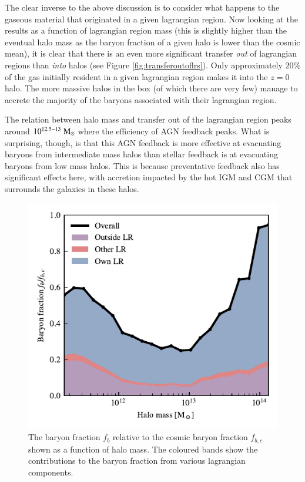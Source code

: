 The clear inverse to the above discussion is to consider what happens to the gaseous
material that originated in a given lagrangian region. Now looking at the results as
a function of lagrangian region mass (this is slightly higher than the eventual
halo mass as the baryon fraction of a given halo is lower than the cosmic mean), it
is clear that there is an even more significant transfer \emph{out} of lagrangian
regions than \emph{into} halos (see Figure \ref{fig:transferoutoflrs}). Only 
approximately $20\%$ of the gas initially resident in a given lagrangian region
makes it into the $z=0$ halo. The more massive halos in the box (of which there 
are very few) manage to accrete the majority of the baryons associated with their
lagrangian region.

The relation between halo mass and transfer out of the lagrangian region peaks
around $10^{12.5-13}\;{\rm M}_{\odot}{}$ where the efficiency of AGN feedback peaks. What
is surprising, though, is that this AGN feedback is more effective at evacuating
baryons from intermediate mass halos than stellar feedback is at evacuating
baryons from low mass halos. This is because preventative feedback also has
significant effects here, with accretion impacted by the hot IGM and CGM that
surrounds the galaxies in these halos.

\begin{figure}
	\centering
	\includegraphics{figures/s50j7kAHF/baryon_fraction_breakdown.pdf}
	\vspace{-0.7cm}
	\caption{The baryon fraction $f_b$ relative to the cosmic baryon fraction
	$f_{b, c}$ shown as a function of halo mass. The coloured bands show the
	contributions to the baryon fraction from various lagrangian components.}
	\label{fig:baryonfraction}
\end{figure}

